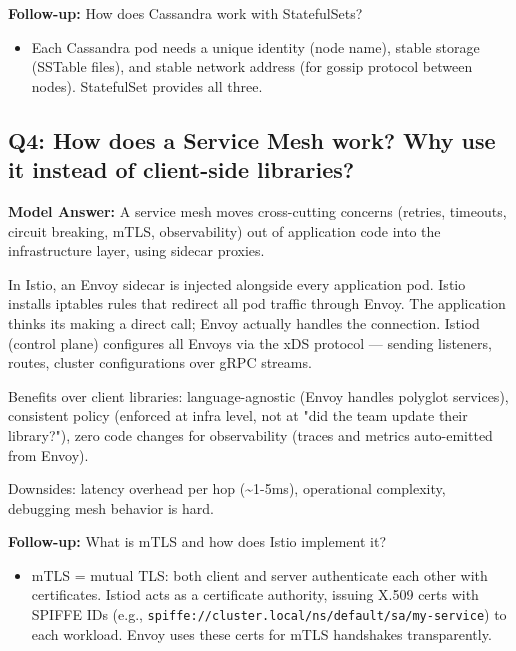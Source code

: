 \documentclass[11pt]{article}
\providecommand{\tightlist}{\setlength{\itemsep}{1pt}\setlength{\parskip}{0pt}}
\begin{document}
\textbf{Follow-up:} How does Cassandra work with StatefulSets?

\begin{itemize}
\tightlist
\item
  Each Cassandra pod needs a unique identity (node name), stable storage (SSTable files), and stable network address (for gossip protocol between nodes). StatefulSet provides all three.
\end{itemize}

\subsection{Q4: How does a Service Mesh work? Why use it instead of client-side libraries?}\label{q4-how-does-a-service-mesh-work-why-use-it-instead-of-client-side-libraries}

\textbf{Model Answer:}
A service mesh moves cross-cutting concerns (retries, timeouts, circuit breaking, mTLS, observability) out of application code into the infrastructure layer, using sidecar proxies.

In Istio, an Envoy sidecar is injected alongside every application pod. Istio installs iptables rules that redirect all pod traffic through Envoy. The application thinks it\textquotesingle s making a direct call; Envoy actually handles the connection. Istiod (control plane) configures all Envoys via the xDS protocol --- sending listeners, routes, cluster configurations over gRPC streams.

Benefits over client libraries: language-agnostic (Envoy handles polyglot services), consistent policy (enforced at infra level, not at "did the team update their library?"), zero code changes for observability (traces and metrics auto-emitted from Envoy).

Downsides: latency overhead per hop (\textasciitilde1-5ms), operational complexity, debugging mesh behavior is hard.

\textbf{Follow-up:} What is mTLS and how does Istio implement it?

\begin{itemize}
\tightlist
\item
  mTLS = mutual TLS: both client and server authenticate each other with certificates. Istiod acts as a certificate authority, issuing X.509 certs with SPIFFE IDs (e.g., \texttt{spiffe://cluster.local/ns/default/sa/my-service}) to each workload. Envoy uses these certs for mTLS handshakes transparently.
\end{itemize}
\end{document}
